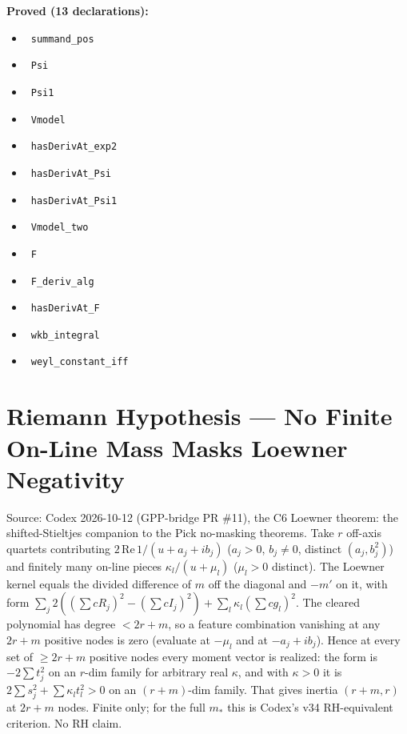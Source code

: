 \documentclass{report}
\theoremstyle{definition}
\begin{document}
\noindent\textbf{Proved (13 declarations):}
\begin{itemize}
  \item {}\leanok\ \texttt{summand\_pos}
  \item {}\leanok\ \texttt{Psi}
  \item {}\leanok\ \texttt{Psi1}
  \item {}\leanok\ \texttt{Vmodel}
  \item {}\leanok\ \texttt{hasDerivAt\_exp2}
  \item {}\leanok\ \texttt{hasDerivAt\_Psi}
  \item {}\leanok\ \texttt{hasDerivAt\_Psi1}
  \item {}\leanok\ \texttt{Vmodel\_two}
  \item {}\leanok\ \texttt{F}
  \item {}\leanok\ \texttt{F\_deriv\_alg}
  \item {}\leanok\ \texttt{hasDerivAt\_F}
  \item {}\leanok\ \texttt{wkb\_integral}
  \item {}\leanok\ \texttt{weyl\_constant\_iff}
\end{itemize}

\section{Riemann Hypothesis --- No Finite On-Line Mass Masks Loewner Negativity}
Source: Codex 2026-10-12 (GPP-bridge PR \#11), the C6 Loewner theorem: the shifted-Stieltjes companion to the Pick no-masking theorems. Take $r$ off-axis quartets contributing $2\,\mathrm{Re}\,1/(u+a_j+ib_j)$ ($a_j>0$, $b_j\ne0$, distinct $(a_j,b_j^2)$) and finitely many on-line pieces $\kappa_l/(u+\mu_l)$ ($\mu_l>0$ distinct). The Loewner kernel equals the divided difference of $m$ off the diagonal and $-m'$ on it, with form $\sum_j2((\sum cR_j)^2-(\sum cI_j)^2)+\sum_l\kappa_l(\sum cg_l)^2$. The cleared polynomial has degree $<2r+m$, so a feature combination vanishing at any $2r+m$ positive nodes is zero (evaluate at $-\mu_l$ and at $-a_j+ib_j$). Hence at every set of $\ge2r+m$ positive nodes every moment vector is realized: the form is $-2\sum t_j^2$ on an $r$-dim family for arbitrary real $\kappa$, and with $\kappa>0$ it is $2\sum s_j^2+\sum\kappa_lt_l^2>0$ on an $(r+m)$-dim family. That gives inertia $(r+m,r)$ at $2r+m$ nodes. Finite only; for the full $m_*$ this is Codex's v34 RH-equivalent criterion. No RH claim.
\end{document}

